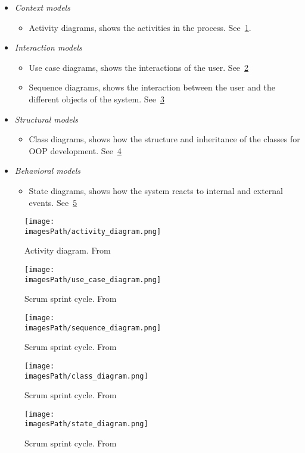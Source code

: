 \begin{itemize}
\item \textit{Context models}
  \begin{itemize}
    \item Activity diagrams, shows the activities in the process. See~\ref{activity_diagram}.
  \end{itemize}
\item \textit{Interaction models}
  \begin{itemize}
  \item Use case diagrams, shows the interactions of the user. See~\ref{use_case_diagram}
  \item Sequence diagrams, shows the interaction between the user and the different objects of the system. See~\ref{sequence_diagram}
  \end{itemize}
\item \textit{Structural models}
  \begin{itemize}
    \item Class diagrams, shows how the structure and inheritance of the classes for OOP development. See~\ref{class_diagram}
  \end{itemize}
\item \textit{Behavioral models}
  \begin{itemize}
    \item State diagrams, shows how the system reacts to internal and external events. See~\ref{state_diagram}
  \end{itemize}
\end{itemize}

\begin{figure}[!ht]
    \centering
    \texttt{[image: \\imagesPath/activity\_diagram.png]}
    \caption{Activity diagram. From~\cite{}}\label{activity_diagram}
\end{figure}
\begin{figure}[!ht]
    \centering
    \texttt{[image: \\imagesPath/use\_case\_diagram.png]}
    \caption{Scrum sprint cycle. From~\cite{}}\label{use_case_diagram}
\end{figure}
\begin{figure}[!ht]
    \centering
    \texttt{[image: \\imagesPath/sequence\_diagram.png]}
    \caption{Scrum sprint cycle. From~\cite{}}\label{sequence_diagram}
\end{figure}
\begin{figure}[!ht]
    \centering
    \texttt{[image: \\imagesPath/class\_diagram.png]}
    \caption{Scrum sprint cycle. From~\cite{}}\label{class_diagram}
\end{figure}
\begin{figure}[!ht]
    \centering
    \texttt{[image: \\imagesPath/state\_diagram.png]}
    \caption{Scrum sprint cycle. From~\cite{}}\label{state_diagram}
\end{figure}


